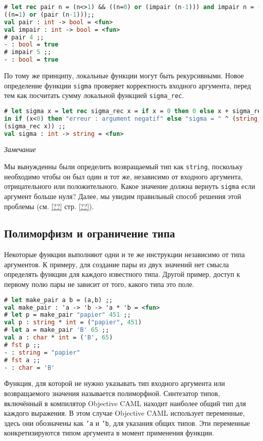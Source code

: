\begin{lstlisting}[language=OCaml]
# let rec pair n = (n<>1) && ((n=0) or (impair (n-1))) and impair n = (n<>0) &&
((n=1) or (pair (n-1)));;
val pair : int -> bool = <fun>
val impair : int -> bool = <fun>
# pair 4 ;;
- : bool = true
# impair 5 ;;
- : bool = true
\end{lstlisting}

По тому же принципу, локальные функции могут быть рекурсивными. Новое
определение функции \texttt{sigma} проверяет корректность входного аргумента,
перед тем как посчитать сумму локальной функцией \texttt{sigma\_rec}.

\begin{lstlisting}[language=OCaml]
# let sigma x = let rec sigma_rec x = if x = 0 then 0 else x + sigma_rec (x-1)
in if (x<0) then "erreur : argument negatif" else "sigma = " ^ (string_of_int
(sigma_rec x)) ;;
val sigma : int -> string = <fun>
\end{lstlisting}

{\it Замечание}

Мы вынужденны были определить возвращаемый тип как \texttt{string}, поскольку
необходимо чтобы он был один и тот же, независимо от входного аргумента,
отрицательного или положительного. Какое значение должна вернуть \texttt{sigma}
если аргумент больше нуля? Далее, мы увидим правильный способ решения этой
проблемы (см. \ref{??} стр. \ref{??}).

\subsection{Полиморфизм и ограничение типа}

Некоторые функции выполняют одни и те же инструкции независимо от типа
аргументов. К примеру, для создание пары из двух значений нет смысла определять
функции для каждого известного типа. Другой пример, доступ к первому полю пары
не зависит от того, какого типа это поле.

\begin{lstlisting}[language=OCaml]
# let make_pair a b = (a,b) ;;
val make_pair : 'a -> 'b -> 'a * 'b = <fun>
# let p = make_pair "papier" 451 ;;
val p : string * int = ("papier", 451)
# let a = make_pair 'B' 65 ;;
val a : char * int = ('B', 65)
# fst p ;;
- : string = "papier"
# fst a ;;
- : char = 'B'
\end{lstlisting}

Функция, для которой не нужно указывать тип входного аргумента или возвращаемого
значения называется полиморфной. Синтезатор типов, включённый в компилятор
Objective CAML находит наиболее общий тип для каждого выражения. В этом случае
Objective CAML использует переменные, здесь они обозначены как \texttt{'a} и
\texttt{'b}, для указания общих типов. Эти переменные конкретизируются типом
аргумента в момент применения функции.

